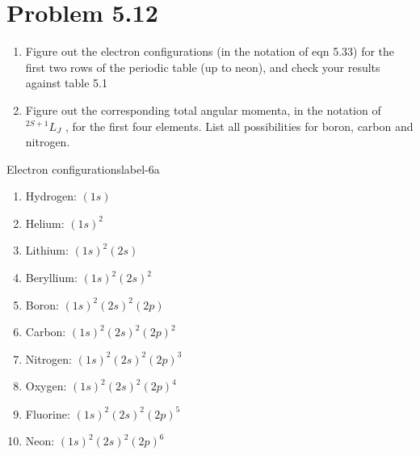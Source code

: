 \documentclass[../main.tex]{subfiles}
\begin{document}
\section{Problem 5.12}

\begin{enumerate}
    \item Figure out the electron configurations (in the notation of eqn 5.33) for the first two rows of the periodic table (up to neon), and check your results against table 5.1
    \item Figure out the corresponding total angular momenta, in the notation of $^{2S+1}L_J$ , for the first four elements.
        List all possibilities for boron, carbon and nitrogen.
\end{enumerate}


\begin{sol}{Electron configurations}{label-6a}

    \begin{enumerate}
        \item Hydrogen: $(1s)$
        \item Helium: $(1s)^2$
        \item Lithium: $(1s)^2(2s)$
        \item Beryllium: $(1s)^2(2s)^2$
        \item Boron: $(1s)^2(2s)^2(2p)$
        \item Carbon: $(1s)^2(2s)^2(2p)^2$
        \item Nitrogen: $(1s)^2(2s)^2(2p)^3$
        \item Oxygen: $(1s)^2(2s)^2(2p)^4$ 
        \item Fluorine: $(1s)^2(2s)^2(2p)^5$ 
        \item Neon: $(1s)^2(2s)^2(2p)^6$ 
    \end{enumerate}

\end{sol}
\end{document}
